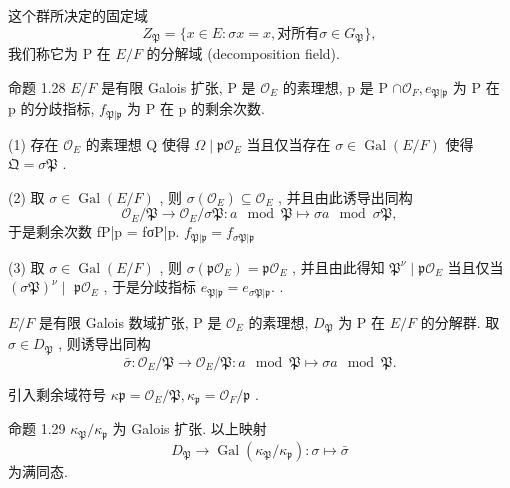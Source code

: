 \documentclass[]{article}
\begin{document}
{这个群所决定的固定域 $$
Z _ {\mathfrak {P}} = \{x \in E: \sigma x = x, \text {对所有} \sigma \in G _ {\mathfrak {P}} \},
$$我们称它为 P 在 $E / F$ 的分解域 (decomposition field). 

命题 1.28 $E / F$ 是有限 Galois 扩张, P 是 $\mathcal { O } _ { E }$ 的素理想, p 是 P $\cap { \mathcal { O } } _ { F } , e _ { \mathfrak { P } | { \mathfrak { p } } }$ 为 P 在 p 的分歧指标, $f _ { \mathfrak { P } | { \mathfrak { p } } }$ 为 P 在 p 的剩余次数. 

(1) 存在 $\mathcal { O } _ { E }$ 的素理想 Q 使得 $\Omega \mid { \mathfrak { p } } { \mathcal { O } } _ { E }$ 当且仅当存在 $\sigma \in \operatorname { G a l } ( E / F )$ 使得 $\mathfrak { Q } = \sigma \mathfrak { P }$ . 

(2) 取 $\sigma \in \operatorname { G a l } ( E / F )$ , 则 $\sigma ( \mathcal { O } _ { E } ) \subseteq \mathcal { O } _ { E }$ , 并且由此诱导出同构 $$
\mathcal {O} _ {E} / \mathfrak {P} \to \mathcal {O} _ {E} / \sigma \mathfrak {P}: a \mod \mathfrak {P} \mapsto \sigma a \mod \sigma \mathfrak {P},
$$于是剩余次数 fP|p = fσP|p. $f _ { \mathfrak { P } | \mathfrak { p } } = f _ { \sigma \mathfrak { P } | \mathfrak { p } }$ 

(3) 取 $\sigma \in \operatorname { G a l } ( E / F )$ , 则 $\sigma ( \mathfrak { p } \mathcal { O } _ { E } ) = \mathfrak { p } \mathcal { O } _ { E }$ , 并且由此得知 $\mathfrak { P } ^ { \nu } \mid \mathfrak { p } \mathcal { O } _ { E }$ 当且仅当 $( \sigma \mathfrak { P } ) ^ { \nu } \mid$ ${ \mathfrak { p } } { \mathcal { O } } _ { E }$ , 于是分歧指标 $e _ { \mathfrak { P } | { \mathfrak { p } } } = e _ { \sigma \mathfrak { P } | { \mathfrak { p } } } .$ . 

$E / F$ 是有限 Galois 数域扩张, P 是 $\mathcal { O } _ { E }$ 的素理想, $D _ { \mathfrak { P } }$ 为 P 在 $E / F$ 的分解群. 取 $\sigma \in D _ { \mathfrak { P } }$ , 则诱导出同构 $$
\bar {\sigma}: \mathcal {O} _ {E} / \mathfrak {P} \to \mathcal {O} _ {E} / \mathfrak {P}: a \mod \mathfrak {P} \mapsto \sigma a \mod \mathfrak {P}.
$$

引入剩余域符号 $\kappa \mathfrak { p } = \mathcal { O } _ { E } / \mathfrak { P } , \kappa _ { \mathfrak { p } } = \mathcal { O } _ { F } / \mathfrak { p }$ . 

命题 1.29 $\kappa _ { \mathfrak { P } } / \kappa _ { \mathfrak { p } }$ 为 Galois 扩张. 以上映射 $$
D _ {\mathfrak {P}} \to \operatorname{Gal} (\kappa_ {\mathfrak {P}} / \kappa_ {\mathfrak {p}}): \sigma \mapsto \bar {\sigma}
$$为满同态. 

}
\end{document}
